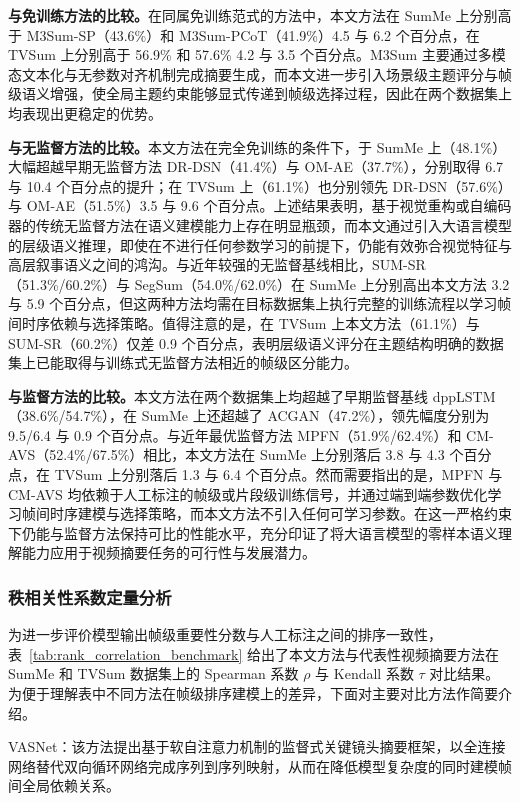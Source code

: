 \textbf{与免训练方法的比较。}\enspace 在同属免训练范式的方法中，本文方法在 SumMe 上分别高于 M3Sum-SP（43.6\%）和 M3Sum-PCoT（41.9\%）4.5 与 6.2 个百分点，在 TVSum 上分别高于 56.9\% 和 57.6\% 4.2 与 3.5 个百分点。M3Sum 主要通过多模态文本化与无参数对齐机制完成摘要生成，而本文进一步引入场景级主题评分与帧级语义增强，使全局主题约束能够显式传递到帧级选择过程，因此在两个数据集上均表现出更稳定的优势。

\textbf{与无监督方法的比较。}\enspace 本文方法在完全免训练的条件下，于 SumMe 上（48.1\%）大幅超越早期无监督方法 DR-DSN（41.4\%）与 OM-AE（37.7\%），分别取得 6.7 与 10.4 个百分点的提升；在 TVSum 上（61.1\%）也分别领先 DR-DSN（57.6\%）与 OM-AE（51.5\%）3.5 与 9.6 个百分点。上述结果表明，基于视觉重构或自编码器的传统无监督方法在语义建模能力上存在明显瓶颈，而本文通过引入大语言模型的层级语义推理，即使在不进行任何参数学习的前提下，仍能有效弥合视觉特征与高层叙事语义之间的鸿沟。与近年较强的无监督基线相比，SUM-SR（51.3\%/60.2\%）与 SegSum（54.0\%/62.0\%）在 SumMe 上分别高出本文方法 3.2 与 5.9 个百分点，但这两种方法均需在目标数据集上执行完整的训练流程以学习帧间时序依赖与选择策略。值得注意的是，在 TVSum 上本文方法（61.1\%）与 SUM-SR（60.2\%）仅差 0.9 个百分点，表明层级语义评分在主题结构明确的数据集上已能取得与训练式无监督方法相近的帧级区分能力。

\textbf{与监督方法的比较。}\enspace 本文方法在两个数据集上均超越了早期监督基线 dppLSTM（38.6\%/54.7\%），在 SumMe 上还超越了 ACGAN（47.2\%），领先幅度分别为 9.5/6.4 与 0.9 个百分点。与近年最优监督方法 MPFN（51.9\%/62.4\%）和 CM-AVS（52.4\%/67.5\%）相比，本文方法在 SumMe 上分别落后 3.8 与 4.3 个百分点，在 TVSum 上分别落后 1.3 与 6.4 个百分点。然而需要指出的是，MPFN 与 CM-AVS 均依赖于人工标注的帧级或片段级训练信号，并通过端到端参数优化学习帧间时序建模与选择策略，而本文方法不引入任何可学习参数。在这一严格约束下仍能与监督方法保持可比的性能水平，充分印证了将大语言模型的零样本语义理解能力应用于视频摘要任务的可行性与发展潜力。

\subsubsection{秩相关性系数定量分析}

为进一步评价模型输出帧级重要性分数与人工标注之间的排序一致性，表~\ref{tab:rank_correlation_benchmark} 给出了本文方法与代表性视频摘要方法在 SumMe 和 TVSum 数据集上的 Spearman 系数 $\rho$ 与 Kendall 系数 $\tau$ 对比结果。为便于理解表中不同方法在帧级排序建模上的差异，下面对主要对比方法作简要介绍。

VASNet\cite{fajtl2018summarizing}：该方法提出基于软自注意力机制的监督式关键镜头摘要框架，以全连接网络替代双向循环网络完成序列到序列映射，从而在降低模型复杂度的同时建模帧间全局依赖关系。

